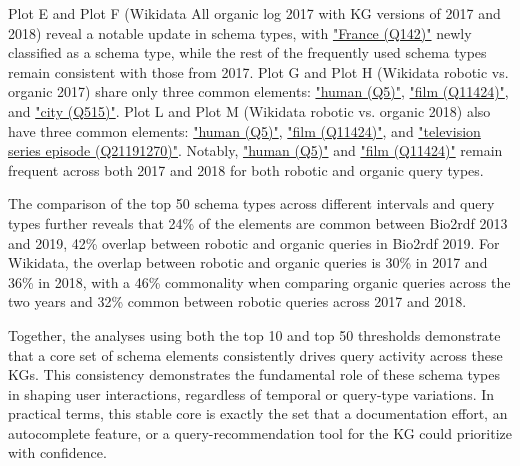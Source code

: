 \documentclass[sw]{iosart2x}
\begin{document}
Plot E and Plot F (Wikidata All organic log 2017 with KG versions of 2017 and 2018) reveal a notable update in schema types, with \href{https://www.wikidata.org/wiki/Q142}{"France (Q142)"} newly classified as a schema type, while the rest of the frequently used schema types remain consistent with those from 2017. Plot G and Plot H (Wikidata robotic vs. organic 2017) share only three common elements: \href{https://www. wikidata.org/wiki/Q5}{"human (Q5)"}, \href{https://www.wikidata.org/wiki/Q11424}{"film (Q11424)"}, and \href{https://www.wikidata.org/wiki/Q515}{"city (Q515)"}. Plot L and Plot M (Wikidata robotic vs. organic 2018) also have three common elements: \href{https://www.wikidata.org/wiki/Q5}{"human (Q5)"}, \href{https://www.wikidata.org/wiki/Q11424}{"film (Q11424)"}, and \href{https://www.wikidata.org/wiki/Q21191270}{"television series episode (Q21191270)"}. Notably, \href{https://www.wikidata.org/wiki/Q5}{"human (Q5)"} and \href{https://www.wikidata.org/wiki/Q11424}{"film (Q11424)"} remain frequent across both 2017 and 2018 for both robotic and organic query types.

The comparison of the top 50 schema types across different intervals and query types further reveals that 24\% of the elements are common between Bio2rdf 2013 and 2019, 42\% overlap between robotic and organic queries in Bio2rdf 2019. For Wikidata, the overlap between robotic and organic queries is 30\% in 2017 and 36\% in 2018, with a 46\% commonality when comparing organic queries across the two years and 32\% common between robotic queries across 2017 and 2018.

Together, the analyses using both the top 10 and top 50 thresholds demonstrate that a core set of schema elements consistently drives query activity across these KGs. This consistency demonstrates the fundamental role of these schema types in shaping user interactions, regardless of temporal or query-type variations. In practical terms, this stable core is exactly the set that a documentation effort, an autocomplete feature, or a query-recommendation tool for the KG could prioritize with confidence.
\end{document}
